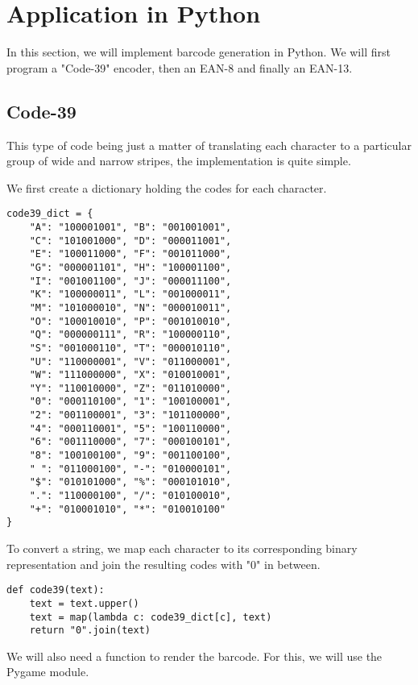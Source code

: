 \section{Application in Python}
\label{sec:barcode_python}

In this section, we will implement barcode generation in Python. We will first program a "Code-39" encoder, then an EAN-8 and finally an EAN-13.

\subsection{Code-39}
\label{ssec:code39_py}

This type of code being just a matter of translating each character to a particular group of wide and narrow stripes, the implementation is quite simple.

We first create a dictionary holding the codes for each character.

\begin{verbatim}
code39_dict = {
    "A": "100001001", "B": "001001001",
    "C": "101001000", "D": "000011001",
    "E": "100011000", "F": "001011000",
    "G": "000001101", "H": "100001100",
    "I": "001001100", "J": "000011100",
    "K": "100000011", "L": "001000011",
    "M": "101000010", "N": "000010011",
    "O": "100010010", "P": "001010010",
    "Q": "000000111", "R": "100000110",
    "S": "001000110", "T": "000010110",
    "U": "110000001", "V": "011000001",
    "W": "111000000", "X": "010010001",
    "Y": "110010000", "Z": "011010000",
    "0": "000110100", "1": "100100001",
    "2": "001100001", "3": "101100000",
    "4": "000110001", "5": "100110000",
    "6": "001110000", "7": "000100101",
    "8": "100100100", "9": "001100100",
    " ": "011000100", "-": "010000101",
    "$": "010101000", "%": "000101010",
    ".": "110000100", "/": "010100010",
    "+": "010001010", "*": "010010100"
}
\end{verbatim}

To convert a string, we map each character to its corresponding binary representation and join the resulting codes with "0" in between.

\begin{verbatim}
def code39(text):
    text = text.upper()
    text = map(lambda c: code39_dict[c], text)
    return "0".join(text)
\end{verbatim}

We will also need a function to render the barcode. For this, we will use the Pygame module.

